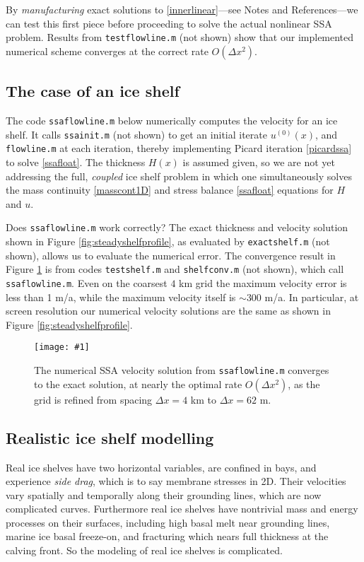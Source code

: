 \documentclass[letterpaper,final,12pt,reqno]{amsart}
\newcommand{\minput}[1]{
\vspace{0.8cm}
\VerbatimInput[frame=single,framesep=3mm,label=\fbox{\normalsize \textsl{\,#1.m\,}},fontfamily=courier,fontsize=\footnotesize]{tmp/#1.slim.m}
\vspace{0.5cm}
}
\newcommand{\onefigsize}[3]{
\begin{figure}[ht]
\centering
\texttt{[image: \#1]}
\caption{#2}
\label{fig:#1}
\end{figure}}
\newcommand{\onefig}[2]{\onefigsize{#1}{#2}{3.0in}}
\begin{document}
\minput{flowline}

By \emph{manufacturing} exact solutions to \eqref{innerlinear}---see Notes and References---we can test this first piece before proceeding to solve the actual nonlinear SSA problem.   Results from \texttt{testflowline.m} (not shown) show that our implemented numerical scheme converges at the correct rate $O(\Delta x^2)$.

\subsection*{The case of an ice shelf}  The code \texttt{ssaflowline.m} below numerically computes the velocity for an ice shelf.  It calls \texttt{ssainit.m} (not shown) to get an initial iterate $u^{(0)}(x)$, and \texttt{flowline.m} at each iteration, thereby implementing Picard iteration \eqref{picardssa} to solve \eqref{ssafloat}.  The thickness $H(x)$ is assumed given, so we are not yet addressing the full, \emph{coupled} ice shelf problem in which one simultaneously solves the mass continuity \eqref{masscont1D} and stress balance \eqref{ssafloat} equations for $H$ and $u$.

\minput{ssaflowline}

Does \texttt{ssaflowline.m} work correctly?  The exact thickness and velocity solution shown in Figure \ref{fig:steadyshelfprofile}, as evaluated by \texttt{exactshelf.m} (not shown), allows us to evaluate the numerical error.  The convergence result in Figure \ref{fig:shelfconv} is from codes \texttt{testshelf.m} and \texttt{shelfconv.m} (not shown), which call \texttt{ssaflowline.m}.  Even on the coarsest $4$ km grid the maximum velocity error is less than 1 m/a, while the maximum velocity itself is $\sim 300$ m/a.  In particular, at screen resolution our numerical velocity solutions are the same as shown in Figure \ref{fig:steadyshelfprofile}.

\onefig{shelfconv}{The numerical SSA velocity solution from \texttt{ssaflowline.m} converges to the exact solution, at nearly the optimal rate $O(\Delta x^2)$, as the grid is refined from spacing $\Delta x=4$ km to $\Delta x=62$ m.}

\subsection*{Realistic ice shelf modelling}  Real ice shelves have two horizontal variables, are confined in bays, and experience \emph{side drag}, which is to say membrane stresses in 2D.  Their velocities vary spatially and temporally along their grounding lines, which are now complicated curves.  Furthermore real ice shelves have nontrivial mass and energy processes on their surfaces, including high basal melt near grounding lines, marine ice basal freeze-on, and fracturing which nears full thickness at the calving front.  So the modeling of real ice shelves is complicated.
\end{document}
